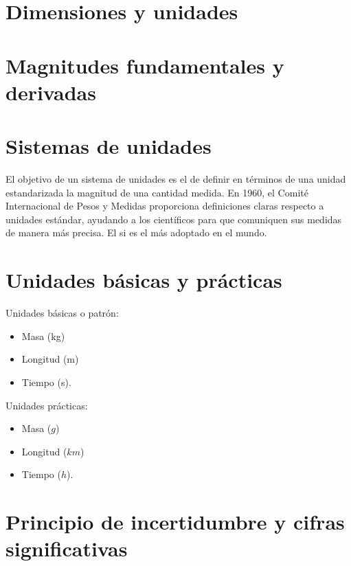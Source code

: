 


\section{Dimensiones y unidades}



\section{Magnitudes fundamentales y derivadas}

    
    


\section{Sistemas de unidades}

El objetivo de un sistema de unidades es el de definir en términos de una unidad estandarizada la magnitud de una cantidad medida. En 1960, el Comité Internacional de Pesos y Medidas proporciona definiciones claras respecto a unidades estándar, ayudando a los científicos para que comuniquen sus medidas de manera más precisa. El \acrfull{si} es el más adoptado en el mundo.

\section{Unidades básicas y prácticas}

Unidades básicas o patrón:
\begin{itemize}
    \item Masa (\unit{kg})
    \item Longitud (\unit{m})
    \item Tiempo (\unit{s}).
\end{itemize}

Unidades prácticas:
\begin{itemize}
    \item Masa ($g$)
    \item Longitud ($km$)
    \item Tiempo ($h$).
\end{itemize}


\section{Principio de incertidumbre y cifras significativas}




